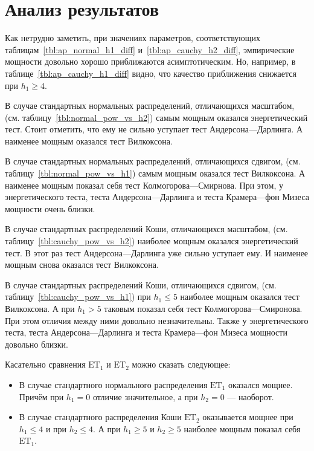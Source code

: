 \documentclass[12pt]{article}
\theoremstyle{break}
\begin{document}
\newpage

\section{Анализ результатов}
Как нетрудно заметить, при значениях параметров, соответствующих таблицам~\ref{tbl:ap_normal_h1_diff} и~\ref{tbl:ap_cauchy_h2_diff}, эмпирические мощности довольно хорошо приближаются асимптотическим. Но, например, в таблице~\ref{tbl:ap_cauchy_h1_diff} видно, что качество приближения снижается при $h_1 \geq 4$.

В случае стандартных нормальных распределений, отличающихся масштабом, (см. таблицу~\ref{tbl:normal_pow_vs_h2}) самым мощным оказался энергетический тест. Стоит отметить, что ему не сильно уступает тест Андерсона---Дарлинга. А наименее мощным оказался тест Вилкоксона.

В случае стандартных нормальных распределений, отличающихся сдвигом, (см. таблицу~\ref{tbl:normal_pow_vs_h1}) самым мощным оказался тест Вилкоксона. А наименее мощным показал себя тест Колмогорова---Смирнова. При этом, у энергетического теста, теста Андерсона---Дарлинга и теста Крамера---фон Мизеса мощности очень близки.

В случае стандартных распределений Коши, отличающихся масштабом, (см. таблицу~\ref{tbl:cauchy_pow_vs_h2}) наиболее мощным оказался энергетический тест. В этот раз тест Андерсона---Дарлинга уже сильно уступает ему. И наименее мощным снова оказался тест Вилкоксона.

В случае стандартных распределений Коши, отличающихся сдвигом, (см. таблицу~\ref{tbl:cauchy_pow_vs_h1}) при $h_1 \leq 5$ наиболее мощным оказался тест Вилкоксона. А при $h_1 > 5$ таковым показал себя тест Колмогорова---Смиронова. При этом отличия между ними довольно незначительны. Также у энергетического теста, теста Андерсона---Дарлинга и теста Крамера---фон Мизеса мощности довольно близки.

Касательно сравнения $\text{ET}_1$ и $\text{ET}_2$ можно сказать следующее:

\begin{itemize}
\item
В случае стандартного нормального распределения $\text{ET}_1$ оказался мощнее. Причём при $h_1=0$ отличие значительное, а при $h_2=0$ --- наоборот.

\item
В случае стандартного распределения Коши $\text{ET}_2$ оказывается мощнее при $h_1 \leqslant 4$ и при $h_2 \leqslant 4$. А при $h_1 \geqslant 5$ и $h_2 \geqslant 5$ наиболее мощным показал себя $\text{ET}_1$.
\end{itemize}
\end{document}
